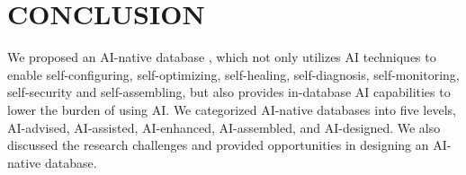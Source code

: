 
\section{CONCLUSION}
\label{sec: conculstion}

We proposed an AI-native database \oursys, which not only utilizes AI techniques to enable self-configuring, self-optimizing, self-healing, self-diagnosis, self-monitoring, self-security and self-assembling, but also provides in-database AI capabilities to lower the burden of using AI. We categorized AI-native databases into five levels, AI-advised, AI-assisted, AI-enhanced, AI-assembled, and AI-designed. We also discussed the research challenges and provided opportunities in designing an AI-native database.  




